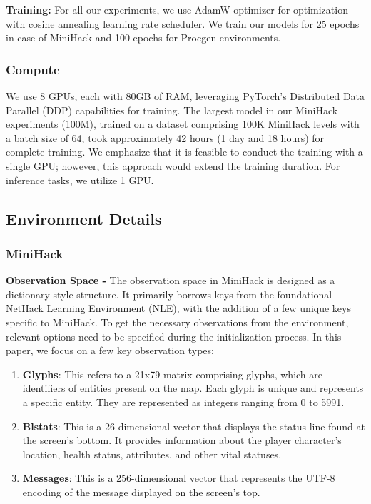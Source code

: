 \textbf{Training:} For all our experiments, we use AdamW optimizer \citep{shen2023unified} for optimization with cosine annealing learning rate scheduler. We train our models for 25 epochs in case of MiniHack and 100 epochs for Procgen environments. 

\subsubsection{Compute} We use 8 GPUs, each with 80GB of RAM, leveraging PyTorch's Distributed Data Parallel (DDP) capabilities for training. The largest model in our MiniHack experiments (100M), trained on a dataset comprising 100K MiniHack levels with a batch size of 64, took approximately 42 hours (1 day and 18 hours) for complete training. We emphasize that it is feasible to conduct the training with a single GPU; however, this approach would extend the training duration. For inference tasks, we utilize 1 GPU.


\subsection{Environment Details}
\label{app:env_details}
\subsubsection{MiniHack}
\textbf{Observation Space - }
The observation space in MiniHack is designed as a dictionary-style structure. It primarily borrows keys from the foundational NetHack Learning Environment (NLE), with the addition of a few unique keys specific to MiniHack. To get the necessary observations from the environment, relevant options need to be specified during the initialization process. In this paper, we focus on a few key observation types:
\begin{enumerate}
    \item \textbf{Glyphs}: This refers to a 21x79 matrix comprising glyphs, which are identifiers of entities present on the map. Each glyph is unique and represents a specific entity. They are represented as integers ranging from 0 to 5991.
    \item \textbf{Blstats}: This is a 26-dimensional vector that displays the status line found at the screen's bottom. It provides information about the player character's location, health status, attributes, and other vital statuses.
    \item \textbf{Messages}: This is a 256-dimensional vector that represents the UTF-8 encoding of the message displayed on the screen's top. 
\end{enumerate}


